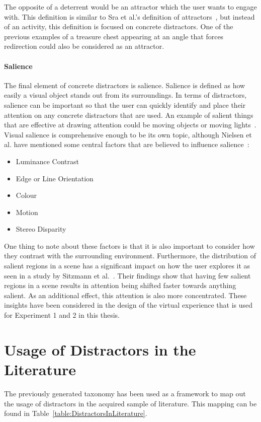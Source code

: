 The opposite of a deterrent would be an attractor which the user wants to engage with. This definition is similar to Sra et al.'s definition of attractors~\cite{sra2018vmotion}, but instead of an activity, this definition is focused on concrete distractors. One of the previous examples of a treasure chest appearing at an angle that forces redirection could also be considered as an attractor. 

\paragraph{Salience}
The final element of concrete distractors is salience. Salience is defined as how easily a visual object stands out from its surroundings. In terms of distractors, salience can be important so that the user can quickly identify and place their attention on any concrete distractors that are used. An example of salient things that are effective at drawing attention could be moving objects or moving lights~\cite{rothe2018guiding}. 
Visual salience is comprehensive enough to be its own topic, although Nielsen et al. have mentioned some central factors that are believed to influence salience~\cite{nielsen2016missing}:
\begin{itemize}
    \item Luminance Contrast
    \item Edge or Line Orientation
    \item Colour
    \item Motion
    \item Stereo Disparity
\end{itemize}
One thing to note about these factors is that it is also important to consider how they contrast with the surrounding environment. Furthermore, the distribution of salient regions in a scene has a significant impact on how the user explores it as seen in a study by Sitzmann et al.~\cite{sitzmann2018saliency}. Their findings show that having few salient regions in a scene results in attention being shifted faster towards anything salient. As an additional effect, this attention is also more concentrated. These insights have been considered in the design of the virtual experience that is used for Experiment 1 and 2 in this thesis.

\section{Usage of Distractors in the Literature}\label{sec:distractorUsageInLiterature}
The previously generated taxonomy has been used as a framework to map out the usage of distractors in the acquired sample of literature. This mapping can be found in Table~\ref{table:DistractorsInLiterature}.

